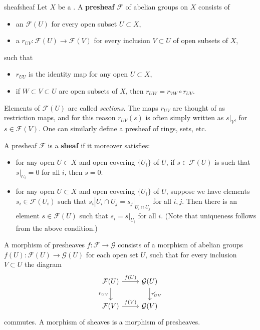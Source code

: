 \begin{topic}{sheaf}{sheaf}
    Let $X$ be a . A \textbf{presheaf} $\mathcal{F}$ of abelian groups on $X$ consists of
    \begin{itemize}
        \item an  $\mathcal{F}(U)$ for every open subset $U \subset X$,
        \item a  $r_{UV} \colon \mathcal{F}(U) \to \mathcal{F}(V)$ for every inclusion $V \subset U$ of open subsets of $X$,
    \end{itemize}
    such that
    \begin{itemize}
        \item $r_{UU}$ is the identity map for any open $U \subset X$,
        \item if $W \subset V \subset U$ are open subsets of $X$, then $r_{UW} = r_{VW} \circ r_{UV}$.
    \end{itemize}
    Elements of $\mathcal{F}(U)$ are called \textit{sections}. The maps $r_{UV}$ are thought of as restriction maps, and for this reason $r_{UV}(s)$ is often simply written as $s|_V$, for $s \in \mathcal{F}(V)$. One can similarly define a presheaf of rings, sets, etc.
    
    A presheaf $\mathcal{F}$ is a \textbf{sheaf} if it moreover satisfies:
    \begin{itemize}
        \item for any open $U \subset X$ and open covering $\{ U_i \}$ of $U$, if $s \in \mathcal{F}(U)$ is such that $s|_{U_i} = 0$ for all $i$, then $s = 0$.
        \item for any open $U \subset X$ and open covering $\{ U_i \}$ of $U$, suppose we have elements $s_i \in \mathcal{F}(U_i)$ such that $s_i|{U_i \cap U_j} = s_j|_{U_i \cap U_j}$ for all $i, j$. Then there is an element $s \in \mathcal{F}(U)$ such that $s_i = s|_{U_i}$ for all $i$. (Note that uniqueness follows from the above condition.)
    \end{itemize}
    
    A morphism of presheaves $f \colon \mathcal{F} \to \mathcal{G}$ consists of a morphism of abelian groups $f(U) \colon \mathcal{F}(U) \to \mathcal{G}(U)$ for each open set $U$, such that for every inclusion $V \subset U$ the diagram
    \[ \svg \begin{tikzcd} \mathcal{F}(U) \arrow{r}{f(U)} \arrow[swap]{d}{r_{UV}} & \mathcal{G}(U) \arrow{d}{r'_{UV}} \\ \mathcal{F}(V) \arrow{r}{f(V)} & \mathcal{G}(V) \end{tikzcd} \]
    commutes. A morphism of sheaves is a morphism of presheaves.
\end{topic}

